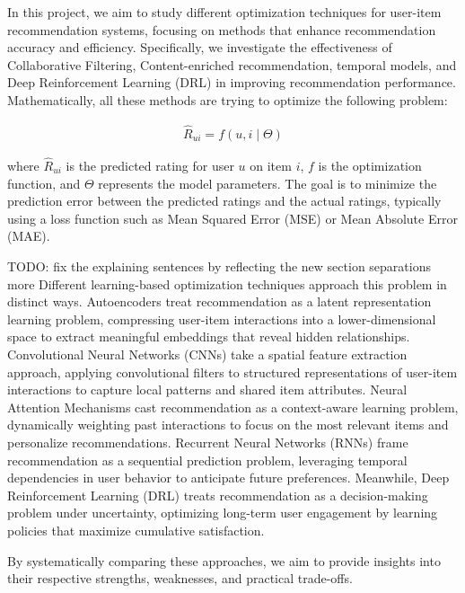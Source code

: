 \documentclass{ieeetj}
\begin{document}
In this project, we aim to study different optimization techniques for user-item recommendation systems, focusing on methods that enhance recommendation accuracy and efficiency. Specifically, we investigate the effectiveness of Collaborative Filtering, Content-enriched recommendation, temporal models, and Deep Reinforcement Learning (DRL) in improving recommendation performance. Mathematically, all these methods are trying to optimize the following problem:

\begin{equation}
\label{eq:opt}
\begin{aligned}
	\hat{R}_{ui} = f(u, i \mid \Theta)
\end{aligned}
\end{equation}

where $\hat{R}_{ui}$ is the predicted rating for user $u$ on item $i$, $f$ is the optimization function, and $\Theta$ represents the model parameters. The goal is to minimize the prediction error between the predicted ratings and the actual ratings, typically using a loss function such as Mean Squared Error (MSE) or Mean Absolute Error (MAE).


TODO: fix the explaining sentences by reflecting the new section separations more
Different learning-based optimization techniques approach this problem in distinct ways. Autoencoders treat recommendation as a latent representation learning problem, compressing user-item interactions into a lower-dimensional space to extract meaningful embeddings that reveal hidden relationships. Convolutional Neural Networks (CNNs) take a spatial feature extraction approach, applying convolutional filters to structured representations of user-item interactions to capture local patterns and shared item attributes. Neural Attention Mechanisms cast recommendation as a context-aware learning problem, dynamically weighting past interactions to focus on the most relevant items and personalize recommendations. Recurrent Neural Networks (RNNs) frame recommendation as a sequential prediction problem, leveraging temporal dependencies in user behavior to anticipate future preferences. Meanwhile, Deep Reinforcement Learning (DRL) treats recommendation as a decision-making problem under uncertainty, optimizing long-term user engagement by learning policies that maximize cumulative satisfaction.

By systematically comparing these approaches, we aim to provide insights into their respective strengths, weaknesses, and practical trade-offs.
\end{document}
